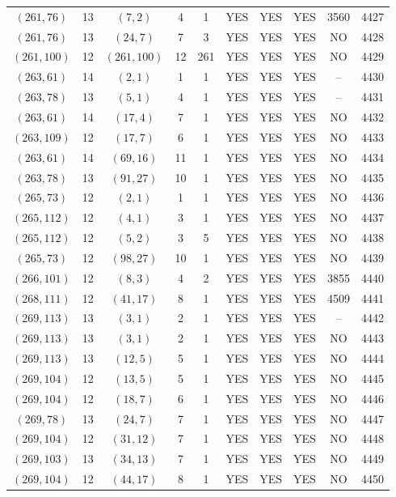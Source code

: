 \begin{longtable}{|c|c|c|c|c|c|c|c|c|c|}
$(261, 76)$ & 13 & $(7, 2)$ & 4 & 1 & YES & YES & YES & 3560 & 4427\\
$(261, 76)$ & 13 & $(24, 7)$ & 7 & 3 & YES & YES & YES & NO & 4428\\
$(261, 100)$ & 12 & $(261, 100)$ & 12 & 261 & YES & YES & YES & NO & 4429\\
$(263, 61)$ & 14 & $(2, 1)$ & 1 & 1 & YES & YES & YES & -- & 4430\\
$(263, 78)$ & 13 & $(5, 1)$ & 4 & 1 & YES & YES & YES & -- & 4431\\
$(263, 61)$ & 14 & $(17, 4)$ & 7 & 1 & YES & YES & YES & NO & 4432\\
$(263, 109)$ & 12 & $(17, 7)$ & 6 & 1 & YES & YES & YES & NO & 4433\\
$(263, 61)$ & 14 & $(69, 16)$ & 11 & 1 & YES & YES & YES & NO & 4434\\
$(263, 78)$ & 13 & $(91, 27)$ & 10 & 1 & YES & YES & YES & NO & 4435\\
$(265, 73)$ & 12 & $(2, 1)$ & 1 & 1 & YES & YES & YES & NO & 4436\\
$(265, 112)$ & 12 & $(4, 1)$ & 3 & 1 & YES & YES & YES & NO & 4437\\
$(265, 112)$ & 12 & $(5, 2)$ & 3 & 5 & YES & YES & YES & NO & 4438\\
$(265, 73)$ & 12 & $(98, 27)$ & 10 & 1 & YES & YES & YES & NO & 4439\\
$(266, 101)$ & 12 & $(8, 3)$ & 4 & 2 & YES & YES & YES & 3855 & 4440\\
$(268, 111)$ & 12 & $(41, 17)$ & 8 & 1 & YES & YES & YES & 4509 & 4441\\
$(269, 113)$ & 13 & $(3, 1)$ & 2 & 1 & YES & YES & YES & -- & 4442\\
$(269, 113)$ & 13 & $(3, 1)$ & 2 & 1 & YES & YES & YES & NO & 4443\\
$(269, 113)$ & 13 & $(12, 5)$ & 5 & 1 & YES & YES & YES & NO & 4444\\
$(269, 104)$ & 12 & $(13, 5)$ & 5 & 1 & YES & YES & YES & NO & 4445\\
$(269, 104)$ & 12 & $(18, 7)$ & 6 & 1 & YES & YES & YES & NO & 4446\\
$(269, 78)$ & 13 & $(24, 7)$ & 7 & 1 & YES & YES & YES & NO & 4447\\
$(269, 104)$ & 12 & $(31, 12)$ & 7 & 1 & YES & YES & YES & NO & 4448\\
$(269, 103)$ & 13 & $(34, 13)$ & 7 & 1 & YES & YES & YES & NO & 4449\\
$(269, 104)$ & 12 & $(44, 17)$ & 8 & 1 & YES & YES & YES & NO & 4450\\

\end{longtable}

